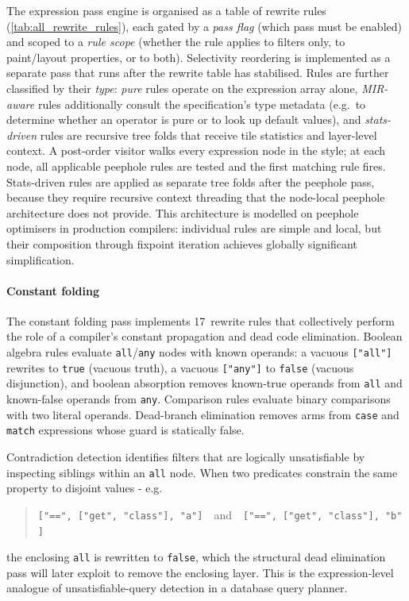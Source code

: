 The expression pass engine is organised as a table of rewrite rules (\cref{tab:all_rewrite_rules}), each gated by a \emph{pass flag} (which pass must be enabled) and scoped to a \emph{rule scope} (whether the rule applies to filters only, to paint/layout properties, or to both).
Selectivity reordering is implemented as a separate pass that runs after the rewrite table has stabilised.
Rules are further classified by their \emph{type}: \emph{pure} rules operate on the expression array alone, \emph{MIR-aware} rules additionally consult the specification's type metadata (e.g.\ to determine whether an operator is pure or to look up default values), and \emph{stats-driven} rules are recursive tree folds that receive tile statistics and layer-level context.
A post-order visitor walks every expression node in the style; at each node, all applicable peephole rules are tested and the first matching rule fires.
Stats-driven rules are applied as separate tree folds after the peephole pass, because they require recursive context threading that the node-local peephole architecture does not provide.
This architecture is modelled on peephole optimisers in production compilers: individual rules are simple and local, but their composition through fixpoint iteration achieves globally significant simplification.

\paragraph{Constant folding}
The constant folding pass implements 17~rewrite rules that collectively perform the role of a compiler's constant propagation and dead code elimination.
Boolean algebra rules evaluate \texttt{all}/\texttt{any} nodes with known operands: a vacuous \texttt{["all"]} rewrites to \texttt{true} (vacuous truth), a vacuous \texttt{["any"]} to \texttt{false} (vacuous disjunction), and boolean absorption removes known-true operands from \texttt{all} and known-false operands from \texttt{any}.
Comparison rules evaluate binary comparisons with two literal operands.
Dead-branch elimination removes arms from \texttt{case} and \texttt{match} expressions whose guard is statically false.

Contradiction detection identifies filters that are logically unsatisfiable by inspecting siblings within an \texttt{all} node.
When two predicates constrain the same property to disjoint values - e.g.\
%
\begin{quote}
\texttt{["==",~["get",~"class"],~"a"]}~~and~~\texttt{["==",~["get",~"class"],~"b"]}
\end{quote}
%
\noindent the enclosing \texttt{all} is rewritten to \texttt{false}, which the structural dead elimination pass will later exploit to remove the enclosing layer.
This is the expression-level analogue of unsatisfiable-query detection in a database query planner.

